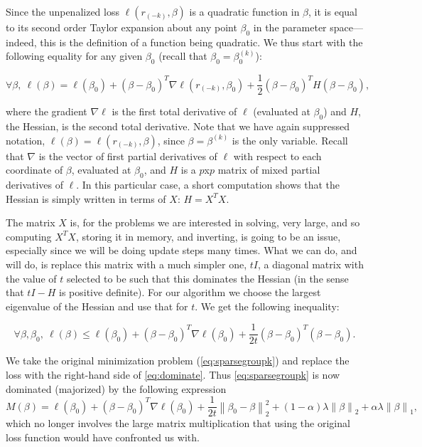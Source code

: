 \documentclass[titlepage]{article}
\newcommand{\norm}[1]{\left\lVert #1 \right\rVert}
\begin{document}
Since the unpenalized loss $\ell (r_{(-k)}, \beta)$ is a quadratic function in $\beta$, it is equal to its second order Taylor expansion about any point $\beta_0$ in the parameter space---indeed, this is the definition of a function being quadratic. We thus start with the following equality for any given $\beta_0$ (recall that $\beta_0 = \beta_0^{(k)}$):  

\begin{equation}
\forall \beta,\ \ell(\beta) = \ell(\beta_0)+(\beta - \beta_0)^T\nabla \ell(r_{(-k)}, \beta_0)+\frac{1}{2}(\beta - \beta_0)^T H (\beta - \beta_0),
\label{eq:TaylorExp}
\end{equation}

where the gradient $\nabla \ell$ is the first total derivative of $\ell$ (evaluated at $\beta_0$) and $H$, the Hessian, is the second total derivative. Note that we have again suppressed notation, $\ell(\beta) = \ell(r_{(-k)},\beta)$, since $\beta = \beta^{(k)}$ is the only variable. Recall that $\nabla$ is the vector of first partial derivatives of $\ell$ with respect to each coordinate of $\beta$, evaluated at $\beta_0$, and $H$ is a $p$x$p$ matrix of mixed partial derivatives of $\ell$. In this particular case, a short computation shows that the Hessian is simply written in terms of $X$: $H = X^TX$.

The matrix $X$ is, for the problems we are interested in solving, very large, and so computing $X^TX$, storing it in memory, and inverting, is going to be an issue, especially since we will be doing update steps many times. What we can do, and will do, is replace this matrix with a much simpler one, $tI$, a diagonal matrix with the value of $t$ selected to be such that this dominates the Hessian (in the sense that $tI - H$ is positive definite). For our algorithm we choose the largest eigenvalue of the Hessian and use that for $t$. We get the following inequality:



\begin{equation}
\forall \beta,\beta_0,\ \ell(\beta) \leq \ell(\beta_0)+(\beta - \beta_0)^T\nabla \ell(\beta_0)+\frac{1}{2t}(\beta - \beta_0)^T  (\beta - \beta_0).
\label{eq:dominate}
\end{equation}

We take the original minimization problem (\autoref{eq:sparsegroupk}) and replace the loss with the right-hand side of \autoref{eq:dominate}. Thus \autoref{eq:sparsegroupk} is now dominated (majorized) by the following expression
\begin{equation}
M(\beta) = \ell(\beta_0)+(\beta - \beta_0)^T\nabla \ell(\beta_0)+\frac{1}{2t}\norm{\beta_0-\beta}_2^2+ (1-\alpha)\lambda\norm{\beta}_2+\alpha\lambda\norm{\beta}_1,
\end{equation}
which no longer involves the large matrix multiplication that using the original loss function would have confronted us with. 
\end{document}
